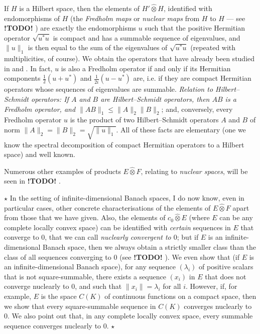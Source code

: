 \documentclass{article}
\theoremstyle{plain}
\newcommand{\aster}[1]{$\star${#1}$\star$}
\newcommand{\hotimes}{\widehat{\otimes}}
\newcommand{\todo}{\textbf{ !TODO! }}
\newcommand{\oldpage}[1]{\marginpar{\footnotesize$\Big\vert$ \textit{p.~#1}}}
\begin{document}
If $H$ is a Hilbert space, then the elements of $H'\hotimes H$, identified with endomorphisms of $H$ (the \emph{Fredholm maps} or \emph{nuclear maps} from $H$ to $H$ --- see \todo) are exactly the endomorphisms $u$ such that the positive Hermitian operator
\oldpage{81}
$\sqrt{u^*u}$ is compact and has a summable sequence of eigenvalues, and $\|u\|_1$ is then equal to the sum of the eigenvalues of $\sqrt{u^*u}$ (repeated with multiplicities, of course).
We obtain the operators that have already been studied in \cite{4} and \cite{8}.
In fact, $u$ is also a Fredholm operator if and only if its Hermitian components $\frac12(u+u^*)$ and $\frac{1}{2i}(u-u^*)$ are, i.e. if they are compact Hermitian operators whose sequences of eigenvalues are summable.
\emph{Relation to Hilbert--Schmidt operators: If $A$ and $B$ are Hilbert--Schmidt operators, then $AB$ is a Fredholm operator, and $\|AB\|_1\leq\|A\|_2\|B\|_2$};
and, conversely, every Fredholm operator $u$ is the product of two Hilbert--Schmidt operators $A$ and $B$ of norm $\|A\|_2=\|B\|_2=\sqrt{\|u\|_1}$.
All of these facts are elementary (one we know the spectral decomposition of compact Hermitian operators to a Hilbert space) and well known.

Numerous other examples of products $E\hotimes F$, relating to \emph{nuclear spaces}, will be seen in \todo.

\aster{
  In the setting of infinite-dimensional Banach spaces, I do now know, even in particular cases, other concrete characterisations of the elements of $E\hotimes F$ apart from those that we have given.
  Also, the elements of $c_0\hotimes E$ (where $E$ can be any complete locally convex space) can be identified with \emph{certain} sequences in $E$ that converge to $0$, that we can call \emph{nuclearly convergent to $0$};
  but if $E$ is an infinite-dimensional Banach space, then we always obtain a strictly smaller class than the class of all sequences converging to $0$ (see \todo).
  We even show that (if $E$ is an infinite-dimensional Banach space), for any sequence $(\lambda_i)$ of positive scalars that is not square-summable, there exists a sequence $(x_i)$ in $E$ that does not converge nuclearly to $0$, and such that $\|x_i\|=\lambda_i$ for all $i$.
  However, if, for example, $E$ is the space $C(K)$ of continuous functions on a compact space, then we show that every square-summable sequence in $C(K)$ converges nuclearly to $0$.
  We also point out that, in any complete locally convex space, every summable sequence converges nuclearly to $0$.
}
\end{document}
